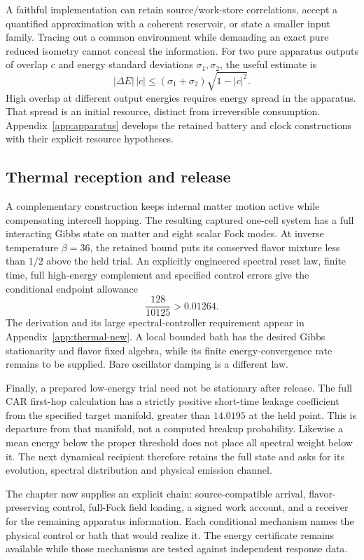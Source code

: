 A faithful implementation can retain source/work-store correlations,
accept a quantified approximation with a coherent reservoir, or state a
smaller input family. Tracing out a common environment while demanding an
exact pure reduced isometry cannot conceal the information. For two pure
apparatus outputs of overlap $c$ and energy standard deviations
$\sigma_1,\sigma_2$, the useful estimate is
\begin{equation}
|\Delta E|\,|c|\leq(\sigma_1+\sigma_2)\sqrt{1-|c|^2}.
\end{equation}
High overlap at different output energies requires energy spread in the
apparatus. That spread is an initial resource, distinct from irreversible
consumption. Appendix~\ref{app:apparatus} develops the retained battery and
clock constructions with their explicit resource hypotheses.

\subsection{Thermal reception and release}

A complementary construction keeps internal matter motion active while
compensating intercell hopping. The resulting captured one-cell system has
a full interacting Gibbs state on matter and eight scalar Fock modes.
At inverse temperature $\beta=36$, the retained bound puts its conserved
flavor mixture less than $1/2$ above the held trial. An explicitly
engineered spectral reset law, finite time, full high-energy complement and
specified control errors give the conditional endpoint allowance
\begin{equation}
\frac{128}{10125}>0.01264.
\end{equation}
The derivation and its large spectral-controller requirement appear in
Appendix~\ref{app:thermal-new}. A local bounded bath has the desired Gibbs
stationarity and flavor fixed algebra, while its finite energy-convergence
rate remains to be supplied. Bare oscillator damping is a different law.

Finally, a prepared low-energy trial need not be stationary after release.
The full CAR first-hop calculation has a strictly positive short-time
leakage coefficient from the specified target manifold, greater than
$14.0195$ at the held point. This is departure from that manifold, not a
computed breakup probability. Likewise a mean energy below the proper
threshold does not place all spectral weight below it. The next dynamical
recipient therefore retains the full state and asks for its evolution,
spectral distribution and physical emission channel.

The chapter now supplies an explicit chain: source-compatible arrival,
flavor-preserving control, full-Fock field loading, a signed work account,
and a receiver for the remaining apparatus information. Each conditional
mechanism names the physical control or bath that would realize it. The
energy certificate remains available while those mechanisms are tested
against independent response data.
